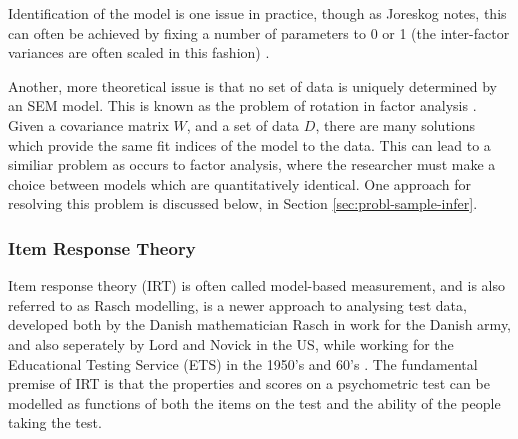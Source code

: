

Identification of the model is one issue in practice, though as Joreskog notes, this can often be achieved by fixing a number of parameters to 0 or 1 (the inter-factor variances are often scaled in this fashion) \cite{joreskog1978structural}.

Another, more theoretical issue is that no set of data is uniquely determined by an SEM model. This is known as the problem of rotation in factor analysis \cite{maccallum2000applications}. Given a covariance matrix $W$, and a set of data $D$, there are many solutions which provide the same fit indices of the model to the data. This can lead to a similiar problem as occurs to factor analysis, where the researcher must make a choice between models which are quantitatively identical. One approach for resolving this problem is discussed below, in Section \ref{sec:probl-sample-infer}.

\subsubsection{Item Response Theory}

Item response theory (IRT) is often called model-based measurement\cite{fischer1995rasch}, and is also referred to as Rasch modelling, is a newer approach to analysing test data, developed both by the Danish mathematician Rasch in work for the Danish army, and also seperately by Lord and Novick in the US, while working for the Educational Testing Service (ETS) in the 1950's and 60's \cite{van1997handbook}.
The fundamental premise of IRT is that the properties and scores on a psychometric test can be modelled as functions of both the items on the test and the ability of the people taking the test.

